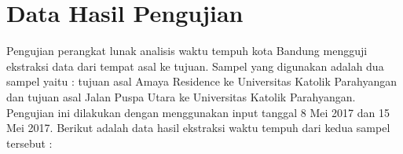 \chapter{Data Hasil Pengujian}
\label{chap:datahasilpengujian}

Pengujian perangkat lunak analisis waktu tempuh kota Bandung mengguji ekstraksi data dari tempat asal ke tujuan. Sampel yang digunakan adalah dua sampel yaitu : tujuan asal Amaya Residence ke Universitas Katolik Parahyangan dan tujuan asal Jalan Puspa Utara ke Universitas Katolik Parahyangan. Pengujian ini dilakukan dengan menggunakan input tanggal 8 Mei 2017 dan 15 Mei 2017. Berikut adalah data hasil ekstraksi waktu tempuh dari kedua sampel tersebut :

